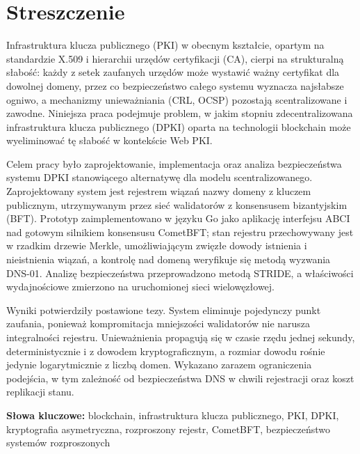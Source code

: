 \chapter*{Streszczenie}

Infrastruktura klucza publicznego (PKI) w obecnym kształcie, opartym na standardzie X.509 i hierarchii urzędów certyfikacji (CA), cierpi na strukturalną słabość: każdy z setek zaufanych urzędów może wystawić ważny certyfikat dla dowolnej domeny, przez co bezpieczeństwo całego systemu wyznacza najsłabsze ogniwo, a mechanizmy unieważniania (CRL, OCSP) pozostają scentralizowane i zawodne. Niniejsza praca podejmuje problem, w jakim stopniu zdecentralizowana infrastruktura klucza publicznego (DPKI) oparta na technologii blockchain może wyeliminować tę słabość w kontekście Web PKI.

Celem pracy było zaprojektowanie, implementacja oraz analiza bezpieczeństwa systemu DPKI stanowiącego alternatywę dla modelu scentralizowanego. Zaprojektowany system jest rejestrem wiązań nazwy domeny z kluczem publicznym, utrzymywanym przez sieć walidatorów z konsensusem bizantyjskim (BFT). Prototyp zaimplementowano w języku Go jako aplikację interfejsu ABCI nad gotowym silnikiem konsensusu CometBFT; stan rejestru przechowywany jest w rzadkim drzewie Merkle, umożliwiającym zwięzłe dowody istnienia i nieistnienia wiązań, a kontrolę nad domeną weryfikuje się metodą wyzwania DNS-01. Analizę bezpieczeństwa przeprowadzono metodą STRIDE, a właściwości wydajnościowe zmierzono na uruchomionej sieci wielowęzłowej.

Wyniki potwierdziły postawione tezy. System eliminuje pojedynczy punkt zaufania, ponieważ kompromitacja mniejszości walidatorów nie narusza integralności rejestru. Unieważnienia propagują się w czasie rzędu jednej sekundy, deterministycznie i z dowodem kryptograficznym, a rozmiar dowodu rośnie jedynie logarytmicznie z liczbą domen. Wykazano zarazem ograniczenia podejścia, w tym zależność od bezpieczeństwa DNS w chwili rejestracji oraz koszt replikacji stanu.

\vspace{1em}
\noindent\textbf{Słowa kluczowe:} blockchain, infrastruktura klucza publicznego, PKI, DPKI, kryptografia asymetryczna, rozproszony rejestr, CometBFT, bezpieczeństwo systemów rozproszonych